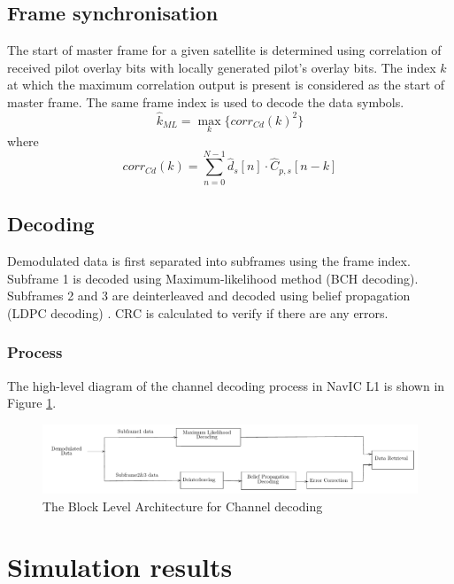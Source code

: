 \documentclass[conference]{IEEEtran}
\begin{document}
\subsection{Frame synchronisation}
The start of master frame for a given satellite is determined using correlation of 
received pilot overlay bits with locally generated pilot's overlay bits. The index $k$ at which the 
maximum correlation output is present is considered as the start of master frame. The same frame
index is used to decode the data symbols.
\begin{equation}
	\hat{k}_{ML}  = \max_{k} \{ corr_{Cd}(k) ^2\}
	\label{eq:sync}
\end{equation}
\noindent where
\begin{equation}
	corr_{Cd}(k) =  \sum_{n=0}^{N-1} \hat{d}_s[n] \cdot \hat{C}_{p,s}[n-k]
	\label{eq:sync1}
\end{equation}

\subsection{Decoding}
Demodulated data is first separated into subframes using the frame index. Subframe 1 is decoded 
using Maximum-likelihood method (BCH decoding). Subframes 2 and 3 are deinterleaved and decoded 
using belief propagation (LDPC decoding) \cite{b6}. CRC is calculated to verify if there are any errors. 
\subsubsection{Process}
The high-level diagram of the channel decoding process in NavIC L1 is shown in Figure 
\ref{fig:decoding_r}.
\begin{normalsize}
\begin{figure}[ht]
\centering
\includegraphics[width=1\columnwidth]{figs/decoding_r}
\centering
\caption{The Block Level Architecture for Channel decoding}
\label{fig:decoding_r}
\end{figure}
\end{normalsize}

\section {Simulation results}
\end{document}

